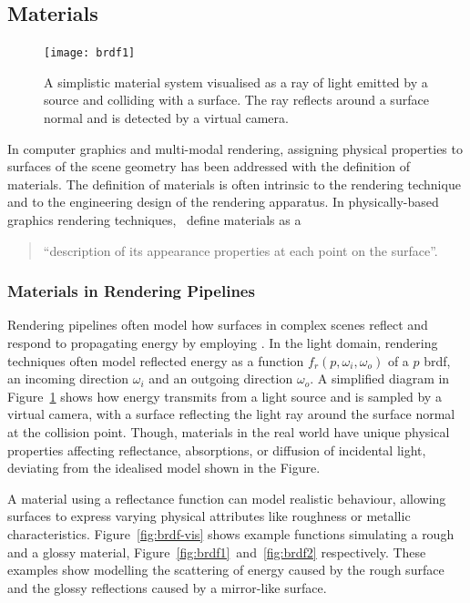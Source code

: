 \subsection{Materials}
\begin{figure}
    \centering
    \texttt{[image: brdf1]}
    \caption[Basic material system in virtual environments]{A simplistic material system visualised as a ray of light emitted by a source and colliding with a surface. The ray reflects around a surface normal and is detected by a virtual camera.}\label{fig:material-vis}
\end{figure}
In computer graphics and multi-modal rendering, assigning physical properties to surfaces of the scene geometry has been addressed with the definition of materials. The definition of materials is often intrinsic to the rendering technique and to the engineering design of the rendering apparatus. In physically-based graphics rendering techniques,~\cite{pharr2023physically} define materials as a
\begin{quotation}
    ``description of its appearance properties at each point on the surface''.
\end{quotation}
\subsubsection{Materials in Rendering Pipelines}
Rendering pipelines often model how surfaces in complex scenes reflect and respond to propagating energy by employing . In the light domain, rendering techniques often model reflected energy as a function $f_r(p, \omega_i, \omega_o)$ of a $p$ \acrshort{brdf}, an incoming direction $\omega_i$ and an outgoing direction $\omega_o$. A simplified diagram in Figure~\ref{fig:material-vis} shows how energy transmits from a light source and is sampled by a virtual camera, with a surface reflecting the light ray around the surface normal at the collision point. Though, materials in the real world have unique physical properties affecting reflectance, absorptions, or diffusion of incidental light, deviating from the idealised model shown in the Figure.\par
A material using a reflectance function can model realistic behaviour, allowing surfaces to express varying physical attributes like roughness or metallic characteristics. Figure~\ref{fig:brdf-vis} shows example functions simulating a rough and a glossy material, Figure~\ref{fig:brdf1}~and~\ref{fig:brdf2} respectively. These examples show  modelling the scattering of energy caused by the rough surface and the glossy reflections caused by a mirror-like surface.\par

